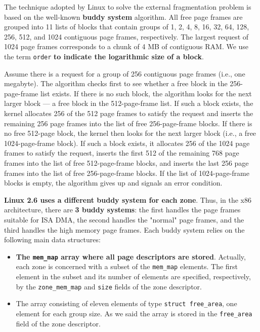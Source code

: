 \documentclass[10pt,a4paper]{article}
\begin{document}
The technique adopted by Linux to solve the external fragmentation problem is based on the well-known \textbf{buddy system} algorithm. All free page frames are grouped into 11 lists of blocks that contain groups of 1, 2, 4, 8, 16, 32, 64, 128, 256, 512, and 1024 contiguous page frames, respectively. The largest request of 1024 page frames corresponds to a chunk of 4 MB of contiguous RAM. We use the term \texttt{order} \textbf{to indicate the logarithmic size of a block}.

Assume there is a request for a group of 256 contiguous page frames (i.e., one megabyte). The algorithm checks first to see whether a free block in the 256-page-frame list exists. If there is no such block, the algorithm looks for the next larger block — a free block in the 512-page-frame list. If such a block exists, the kernel allocates 256 of the 512 page frames to satisfy the request and inserts the remaining 256 page frames into the list of free 256-page-frame blocks. If there is no free 512-page block, the kernel then looks for the next larger block (i.e., a free 1024-page-frame block). If
such a block exists, it allocates 256 of the 1024 page frames to satisfy the request, inserts the first 512 of the remaining 768 page frames into the list of free 512-page-frame blocks, and inserts the last 256 page frames into the list of free 256-page-frame blocks. If the list of 1024-page-frame blocks is empty, the algorithm gives up and signals an error condition.

\textbf{Linux 2.6 uses a different buddy system for each zone}. Thus, in the x86 architecture, there are \textbf{3 buddy systems}: the first handles the page frames suitable for ISA DMA, the second handles the "normal" page frames, and the third handles the high memory page frames. Each buddy system relies on the following main data structures:
\begin{itemize}
\item \textbf{The \texttt{mem\_map} array where all page descriptors are stored}. Actually, each zone is concerned with a subset of the \texttt{mem\_map} elements. The first element in the subset and its number of elements are specified, respectively, by the \texttt{zone\_mem\_map} and \texttt{size} fields of the zone descriptor.

\item The array consisting of eleven elements of type \texttt{struct free\_area}, one element for each group size. As we said the array is stored in the \texttt{free\_area} field of the zone descriptor.
\end{itemize}
\end{document}
